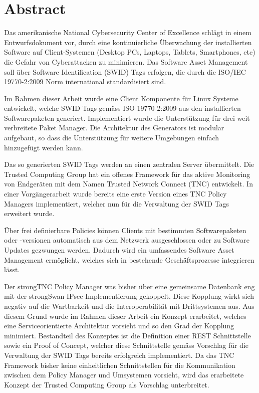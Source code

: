\chapter{Abstract}

Das amerikanische National Cybersecurity Center of Excellence
schlägt in einem Entwurfsdokument vor, durch eine kontinuierliche
Überwachung der installierten Software auf Client-Systemen
(Desktop PCs, Laptops, Tablets, Smartphones, etc) die Gefahr von
Cyberattacken zu minimieren. Das Software Asset Management soll
über Software Identification (SWID) Tags erfolgen, die durch die
ISO/IEC 19770-2:2009 Norm international standardisiert sind.

Im Rahmen dieser Arbeit wurde eine Client Komponente für Linux Systeme
entwickelt, welche SWID Tags gemäss ISO 19770-2:2009 aus den installierten
Softwarepaketen generiert. Implementiert wurde die Unterstützung für drei weit
verbreitete Paket Manager. Die Architektur des Generators ist modular aufgebaut, so dass die
Unterstützung für weitere Umgebungen einfach hinzugefügt werden kann.

Das so generierten SWID Tags werden an einen zentralen Server
übermittelt. Die Trusted Computing Group hat ein offenes Framework für
das aktive Monitoring von Endgeräten mit dem Namen Trusted Network
Connect (TNC) entwickelt. In einer Vorgängerarbeit wurde bereits eine erste Version eines
TNC Policy Managers implementiert, welcher nun für die Verwaltung der SWID Tags
erweitert wurde.

Über frei definierbare Policies können Clients mit bestimmten Softwarepaketen
oder -versionen automatisch aus dem Netzwerk ausgeschlossen oder zu Software
Updates gezwungen werden. Dadurch wird ein umfassendes Software Asset
Management ermöglicht, welches sich in bestehende Geschäftsprozesse integrieren
lässt.

Der strongTNC Policy Manager was bisher über eine gemeinsame Datenbank eng mit
der strongSwan IPsec Implementierung gekoppelt. Diese Kopplung wirkt sich
negativ auf die Wartbarkeit und die Interoperabilität mit Drittsystemen aus.
Aus diesem Grund wurde im Rahmen dieser Arbeit ein Konzept erarbeitet, welches
eine Serviceorientierte Architektur vorsieht und so den Grad der Kopplung minimiert.
Bestandteil des Konzeptes ist die Definition einer REST Schnittstelle sowie ein Proof of Concept, welcher
diese Schnittstelle gemäss Vorschlag für die Verwaltung der SWID Tags bereits
erfolgreich implementiert. Da das TNC Framework bisher keine einheitlichen Schnittstellen für die Kommunikation
zwischen dem Policy Manager und Umsystemen vorsieht, wird das
erarbeitete Konzept der Trusted Computing Group als Vorschlag
unterbreitet.